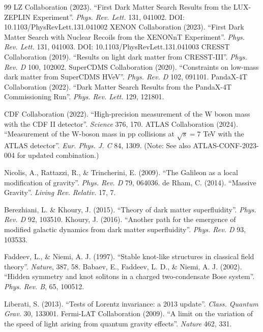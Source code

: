 \documentclass[a4paper,12pt]{article}
\begin{document}
\begin{thebibliography}{99}
 LZ Collaboration (2023). ``First Dark Matter Search Results from the LUX-ZEPLIN Experiment''. \textit{Phys. Rev. Lett.} 131, 041002. DOI: 10.1103/PhysRevLett.131.041002
 XENON Collaboration (2023). ``First Dark Matter Search with Nuclear Recoils from the XENONnT Experiment''. \textit{Phys. Rev. Lett.} 131, 041003. DOI: 10.1103/PhysRevLett.131.041003
 CRESST Collaboration (2019). ``Results on light dark matter from CRESST-III''. \textit{Phys. Rev. D} 100, 102002.
 SuperCDMS Collaboration (2020). ``Constraints on low-mass dark matter from SuperCDMS HVeV''. \textit{Phys. Rev. D} 102, 091101.
 PandaX-4T Collaboration (2022). ``Dark Matter Search Results from the PandaX-4T Commissioning Run''. \textit{Phys. Rev. Lett.} 129, 121801.

 CDF Collaboration (2022). ``High-precision measurement of the W boson mass with the CDF II detector''. \textit{Science} 376, 170.
 ATLAS Collaboration (2024). ``Measurement of the W-boson mass in pp collisions at $\sqrt{s}=7$ TeV with the ATLAS detector''. \textit{Eur. Phys. J. C} 84, 1309. (Note: See also ATLAS-CONF-2023-004 for updated combination.)

 Nicolis, A., Rattazzi, R., \& Trincherini, E. (2009). ``The Galileon as a local modification of gravity''. \textit{Phys. Rev. D} 79, 064036.
 de Rham, C. (2014). ``Massive Gravity''. \textit{Living Rev. Relativ.} 17, 7.

 Berezhiani, L. \& Khoury, J. (2015). ``Theory of dark matter superfluidity''. \textit{Phys. Rev. D} 92, 103510.
 Khoury, J. (2016). ``Another path for the emergence of modified galactic dynamics from dark matter superfluidity''. \textit{Phys. Rev. D} 93, 103533.

 Faddeev, L., \& Niemi, A. J. (1997). ``Stable knot-like structures in classical field theory''. \textit{Nature}, 387, 58.
 Babaev, E., Faddeev, L. D., \& Niemi, A. J. (2002). ``Hidden symmetry and knot solitons in a charged two-condensate Bose system''. \textit{Phys. Rev. B}, 65, 100512.

 Liberati, S. (2013). ``Tests of Lorentz invariance: a 2013 update''. \textit{Class. Quantum Grav.} 30, 133001.
 Fermi-LAT Collaboration (2009). ``A limit on the variation of the speed of light arising from quantum gravity effects''. \textit{Nature} 462, 331.


\end{thebibliography}
\end{document}

